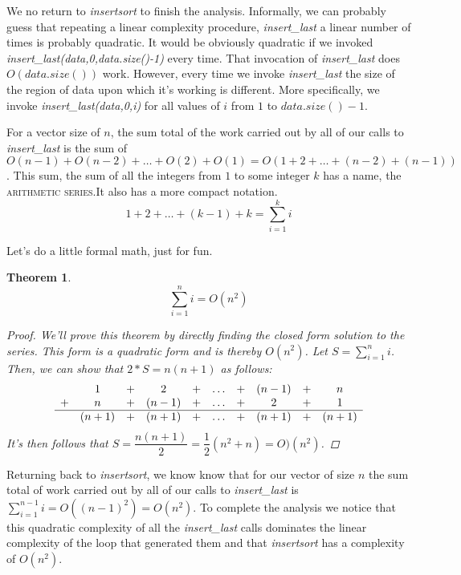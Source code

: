 \documentclass[]{tufte-handout}
\newtheorem{theorem}{Theorem}
\begin{document}
We no return to \textit{insertsort} to finish the analysis. Informally, we can probably guess that repeating a linear complexity procedure, \textit{insert\_last} a linear number of times is probably quadratic. It would be obviously quadratic if we invoked \textit{insert\_last(data,0,data.size()-1)} every time. That invocation of \textit{insert\_last} does $O(data.size())$ work.  However, every time we invoke \textit{insert\_last} the size of the region of data upon which it's working is different. More specifically, we invoke \textit{insert\_last(data,0,i)} for all values of $i$ from $1$ to $data.size()-1$. 

For a vector size of $n$, the sum total of the work carried out by all of our calls to \textit{insert\_last} is the sum of $O(n-1)+O(n-2)+ \ldots + O(2)+O(1) = O(1+2+\ldots+(n-2)+(n-1))$. This sum, the sum of all the integers from $1$ to some integer $k$ has a name, the \textsc{arithmetic series}.It also has a more compact notation. 
\[
1+2+ \ldots + (k-1)+ k = \sum\limits_{i=1}^{k} i 
\]

Let's do a little formal math, just for fun.
\begin{theorem}
\[
\sum\limits_{i=1}^{n} i = O(n^2) 
\]
\begin{proof}
We'll prove this theorem by directly finding the closed form solution to the series. This form is a quadratic form and is thereby $O(n^2)$. Let $\mathit{S} = \sum\limits_{i=1}^{n} i$. Then, we can show that $2*S = n(n+1)$ as follows:
\[
\begin{array}{cccccccccc}
  & 1 & + & 2 & + & \ldots & + & (n-1) & + &n \\
+ & n & + & (n-1) & + & \ldots & + & 2 & + & 1 \\ \hline
 & (n+1) & + & (n+1) & + & \ldots & + & (n+1) & + & (n+1) 
\end{array}
\]
It's then follows that  $\mathit{S} = \dfrac{n(n+1)}{2} = \dfrac{1}{2}(n^2+n) = O)(n^2)$. 
\end{proof}
\label{th:arithser}
\end{theorem}

Returning back to \textit{insertsort}, we know know that for our vector of size $n$ the sum total of work carried out by all of our calls to \textit{insert\_last} is $\sum\limits_{i=1}^{n-1} i = O((n-1)^2) = O(n^2)$. To complete the analysis we notice that this quadratic complexity of all the \textit{insert\_last} calls dominates the linear complexity of the loop that generated them and that \textit{insertsort} has a complexity of $O(n^2)$.
\end{document}

